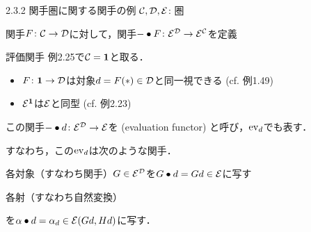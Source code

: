 \documentclass[uplatex,a4paper,dvipdfmx,aspectratio=169,10pt]{beamer}
\begin{document}
\begin{frame}[fragile]{2.3.2 関手圏に関する関手の例}
    $\mathcal{C}, \mathcal{D}, \mathcal{E}$: 圏

     関手$F \colon \mathcal{C} \to \mathcal{D}$に対して，関手$- \bullet F \colon \mathcal{E}^{\mathcal{D}} \to \mathcal{E}^{\mathcal{C}}$を定義
    \begin{exampleblock}{ 評価関手}
        例2.25で$\mathcal{C} = {\mathord{\mathbf{1}}}$と取る．
        \begin{itemize}
            \item $F \colon {\mathord{\mathbf{1}}} \to \mathcal{D}$は対象$d = F(*) \in \mathcal{D}$と同一視できる (cf. 例1.49)
            \item $\mathcal{E}^{\mathord{\mathbf{1}}}$は$\mathcal{E}$と同型 (cf. 例2.23)
        \end{itemize}
        この関手$- \bullet d \colon \mathcal{E}^{\mathcal{D}} \to \mathcal{E}$を (evaluation functor) と呼び，${\mathrm{ev}}_d$でも表す．
    \end{exampleblock}
    すなわち，この${\mathrm{ev}}_d$は次のような関手．
        \begin{description}[対象への作用:]
            \item[対象への作用:] 各対象（すなわち関手）$G \in \mathcal{E}^{\mathcal{D}}$を$G \bullet d = Gd \in \mathcal{E}$に写す
            \item[射への作用:] 各射（すなわち自然変換） を$\alpha \bullet d = \alpha_d \in \mathcal{E}(Gd, Hd)$に写す．
        \end{description}
\end{frame}
\end{document}
